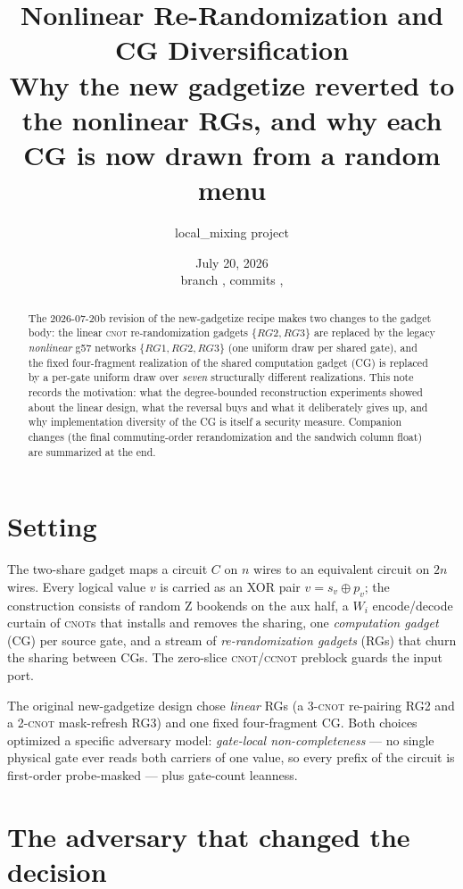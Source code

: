 \documentclass[11pt]{article}
\title{\textbf{Nonlinear Re-Randomization and CG Diversification}\\[2pt]
\large Why the new gadgetize reverted to the nonlinear RGs, and why each CG
is now drawn from a random menu}
\author{local\_mixing project}
\date{July 20, 2026 \\ \small branch \code{ssg-gen-mix-clean}, commits
\code{813bf256}, \code{4fe82458}}
\newcommand{\CNOT}{\textsc{cnot}}
\newcommand{\CCNOT}{\textsc{ccnot}}
\begin{document}
\maketitle

\begin{abstract}
\noindent The 2026-07-20b revision of the new-gadgetize recipe makes two
changes to the gadget body: the linear \CNOT{} re-randomization gadgets
$\{RG2, RG3\}$ are replaced by the legacy \emph{nonlinear} g57 networks
$\{RG1, RG2, RG3\}$ (one uniform draw per shared gate), and the fixed
four-fragment realization of the shared computation gadget (CG) is replaced
by a per-gate uniform draw over \emph{seven} structurally different
realizations. This note records the motivation: what the degree-bounded
reconstruction experiments showed about the linear design, what the
reversal buys and what it deliberately gives up, and why implementation
diversity of the CG is itself a security measure. Companion changes (the
final commuting-order rerandomization and the sandwich column float) are
summarized at the end.
\end{abstract}

\section{Setting}

The two-share gadget maps a circuit $C$ on $n$ wires to an equivalent
circuit on $2n$ wires. Every logical value $v$ is carried as an XOR pair
$v = s_v \oplus p_v$; the construction consists of random Z bookends on the
aux half, a $W_i$ encode/decode curtain of \CNOT{}s that installs and
removes the sharing, one \emph{computation gadget} (CG) per source gate,
and a stream of \emph{re-randomization gadgets} (RGs) that churn the
sharing between CGs. The zero-slice \CNOT/\CCNOT{} preblock guards the
input port.

The original new-gadgetize design chose \emph{linear} RGs (a 3-\CNOT{}
re-pairing RG2 and a 2-\CNOT{} mask-refresh RG3) and one fixed
four-fragment CG. Both choices optimized a specific adversary model:
\emph{gate-local non-completeness} --- no single physical gate ever reads
both carriers of one value, so every prefix of the circuit is first-order
probe-masked --- plus gate-count leanness.

\section{The adversary that changed the decision}
\end{document}
